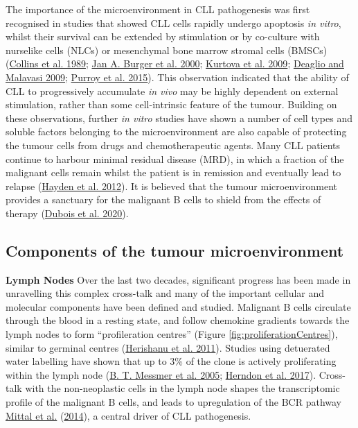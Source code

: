 \documentclass[11pt, a4paper, twosided]{book}
\begin{document}
The importance of the microenvironment in CLL pathogenesis was first recognised in studies that showed CLL cells rapidly undergo apoptosis \emph{in vitro}, whilst their survival can be extended by stimulation or by co-culture with nurselike cells (NLCs) or mesenchymal bone marrow stromal cells (BMSCs) (\protect\hyperlink{ref-Collins1989}{Collins et al. 1989}; \protect\hyperlink{ref-Burger2000}{Jan A. Burger et al. 2000}; \protect\hyperlink{ref-Kurtova2009}{Kurtova et al. 2009}; \protect\hyperlink{ref-Deaglio2009}{Deaglio and Malavasi 2009}; \protect\hyperlink{ref-Purroy2015}{Purroy et al. 2015}). This observation indicated that the ability of CLL to progressively accumulate \emph{in vivo} may be highly dependent on external stimulation, rather than some cell-intrinsic feature of the tumour. Building on these observations, further \emph{in vitro} studies have shown a number of cell types and soluble factors belonging to the microenvironment are also capable of protecting the tumour cells from drugs and chemotherapeutic agents. Many CLL patients continue to harbour minimal residual disease (MRD), in which a fraction of the malignant cells remain whilst the patient is in remission and eventually lead to relapse (\protect\hyperlink{ref-Hayden2012}{Hayden et al. 2012}). It is believed that the tumour microenvironment provides a sanctuary for the malignant B cells to shield from the effects of therapy (\protect\hyperlink{ref-Dubois2020}{Dubois et al. 2020}).

\hypertarget{components-of-the-tumour-microenvironment}{%
\subsection{Components of the tumour microenvironment}\label{components-of-the-tumour-microenvironment}}

\textbf{Lymph Nodes}
Over the last two decades, significant progress has been made in unravelling this complex cross-talk and many of the important cellular and molecular components have been defined and studied. Malignant B cells circulate through the blood in a resting state, and follow chemokine gradients towards the lymph nodes to form ``profileration centres'' (Figure \ref{fig:proliferationCentres}), similar to germinal centres (\protect\hyperlink{ref-Herishanu2011}{Herishanu et al. 2011}). Studies using detuerated water labelling have shown that up to 3\% of the clone is actively proliferating within the lymph node (\protect\hyperlink{ref-Messmer2005}{B. T. Messmer et al. 2005}; \protect\hyperlink{ref-Herndon2017}{Herndon et al. 2017}). Cross-talk with the non-neoplastic cells in the lymph node shapes the transcriptomic profile of the malignant B cells, and leads to upregulation of the BCR pathway \protect\hyperlink{ref-Mittal2014}{Mittal et al.} (\protect\hyperlink{ref-Mittal2014}{2014}), a central driver of CLL pathogenesis.
\end{document}
